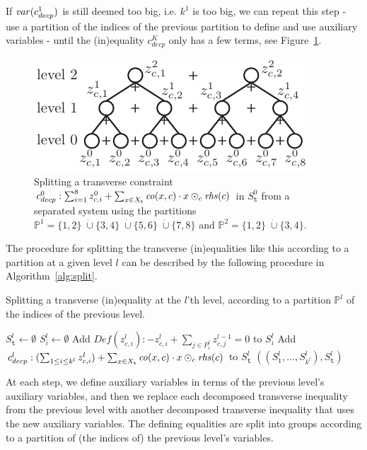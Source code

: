 If $\mathit{var}(c_{decp}^1)$ is still deemed too big, i.e. $k^1$ is too big, we can repeat this step - use a partition of the indices of the previous partition to define and use auxiliary variables - until the (in)equality $c_{decp}^K$ only has a few terms, see Figure~\ref{fig:split}.
%
\begin{figure}
	\centering
		\includegraphics{figures/split.pdf}
	\caption{Splitting a transverse constraint $c^0_{decp}: \sum_{i = 1}^8 z^0_{c,i} + \sum_{x\in X_{\texttt{t}}}\mathit{co}(x,c)\cdot x\odot_c \mathit{rhs}(c)$ in $S_\texttt{t}^0$ from a separated system using the partitions $\mathbb{P}^1 = \{1,2\}\;\dot\cup\{3,4\}\;\dot\cup\{5,6\}\;\dot\cup\{7,8\}$ and $\mathbb{P}^2 = \{1,2\}\;\dot\cup\{3,4\}$. 
	}
	\label{fig:split}
\end{figure}
%
The procedure for splitting the transverse (in)equalities like this according to a partition at a given level $l$ can be described by the following procedure  in Algorithm~\ref{alg:split}.
%

\begin{algorithm}\caption{Splitting a transverse (in)equality at the $l$'th level, according to a partition $\mathbb{P}^l$ of the indices of the previous level.}
\label{alg:split}
\begin{algorithmic}
\Function{SplitTransverse}{%
Transverse (in)equalities $S^0_\texttt{t}$, partitions $\mathbb{P}^l = (P^l_1, \ldots, P^l_{k^l})$}
	\State $S_\texttt{t}^l\gets \emptyset$%
		\State $S^l_i \gets \emptyset$ 
				\State Add $\mathit{Def}(z^l_{c,i}): -z^l_{c,i} + \sum_{j\in P^l_i} z^{l-1}_{c,j} = 0$ to $S^l_i$
		\EndFor
		\State Add $c_{decp}^l: (\sum_{1\leq i\leq k^l} z^l_{c,i}) + \sum_{x\in X_{\texttt{t}}}\mathit{co}(x,c)\cdot x \odot_c \mathit{rhs}(c)$
 to $S_\texttt{t}^l$
	\EndFor
	\State\Return $((S^l_1,\ldots, S^l_{k^l}), S^l_\texttt{t})$
\EndFunction
\end{algorithmic}
\end{algorithm}
%
At each step, we define auxiliary variables in terms of the previous level's auxiliary variables, and then we replace each decomposed transverse inequality from the previous level with another decomposed transverse inequality that uses the new auxiliary variables. The defining equalities are split into groups according to a partition of (the indices of) the previous level's variables.

